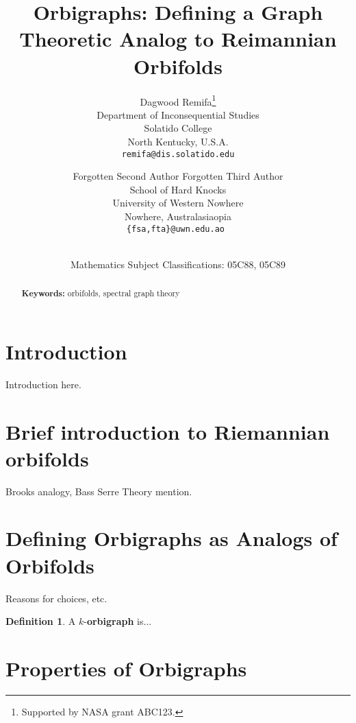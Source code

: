 \documentclass[12pt]{article}
\title{\bf Orbigraphs: Defining a Graph Theoretic Analog to Reimannian Orbifolds}
\author{Dagwood Remifa\thanks{Supported by NASA grant ABC123.}\\
\small Department of Inconsequential Studies\\[-0.8ex]
\small Solatido College\\[-0.8ex] 
\small North Kentucky, U.S.A.\\
\small\tt remifa@dis.solatido.edu\\
\and
Forgotten Second Author \qquad  Forgotten Third Author\\
\small School of Hard Knocks\\[-0.8ex]
\small University of Western Nowhere\\[-0.8ex]
\small Nowhere, Australasiaopia\\
\small\tt \{fsa,fta\}@uwn.edu.ao
}
\date{\dateline{Jan 1, 2012}{Jan 2, 2012}\\
\small Mathematics Subject Classifications: 05C88, 05C89}
\theoremstyle{plain}
\theoremstyle{definition}
\newtheorem{definition}[theorem]{Definition}
\theoremstyle{remark}
\begin{document}
\maketitle


\begin{abstract}
  \bigskip\noindent \textbf{Keywords:} orbifolds, spectral graph theory
\end{abstract}

\section{Introduction}

Introduction here.

\section{Brief introduction to Riemannian orbifolds}

Brooks analogy, Bass Serre Theory mention.

\section{Defining Orbigraphs as Analogs of Orbifolds}

Reasons for choices, etc.
\begin{definition}
A $k$-\textbf{orbigraph} is...
\end{definition}

\section{Properties of Orbigraphs}
\end{document}
